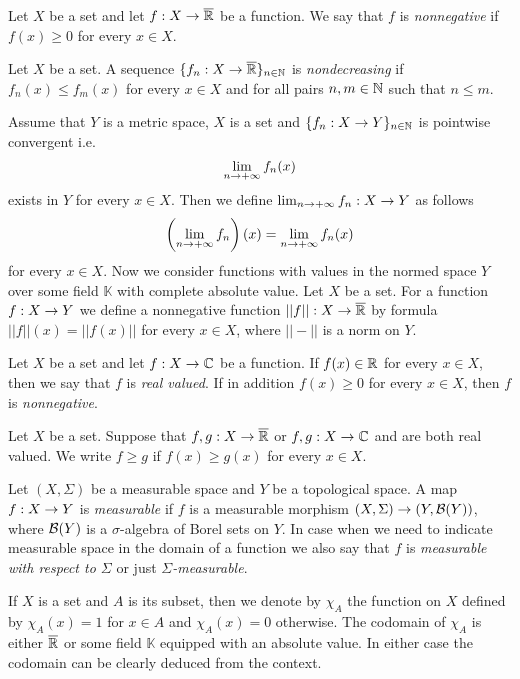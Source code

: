 \begin{definition}
Let $X$ be a set and let $f:X\rightarrow \overline{{\mathbb R}}$ be a function. We say that $f$ is \textit{nonnegative} if $f(x) \geq 0$ for every $x\in X$.
\end{definition}

\begin{definition}
Let $X$ be a set. A sequence $\{f_n:X\rightarrow \overline{{\mathbb R}}\}_{n\in {\mathbb N}}$ is \textit{nondecreasing} if $f_n(x) \leq f_m(x)$ for every $x\in X$ and for all pairs $n, m\in {\mathbb N}$ such that $n\leq m$.
\end{definition}
\noindent
Assume that $Y$ is a metric space, $X$ is a set and $\{f_n:X\rightarrow Y\}_{n\in {\mathbb N}}$ is pointwise convergent i.e.
$$\lim_{n\rightarrow +\infty}f_n(x)$$
exists in $Y$ for every $x\in X$. Then we define $\lim_{n\rightarrow +\infty}f_n:X\rightarrow Y$ as follows
$$\left(\lim_{n\rightarrow +\infty}f_n\right)(x) = \lim_{n\rightarrow +\infty}f_n(x)$$
for every $x\in X$. Now we consider functions with values in the normed space $Y$ over some field $\mathbb{K}$ with complete absolute value. Let $X$ be a set. For a function $f:X\rightarrow Y$ we define a nonnegative function $||f||:X\rightarrow \overline{{\mathbb R}}$ by formula $||f||(x) = ||f(x)||$ for every $x\in X$, where $||-||$ is a norm on $Y$.

\begin{definition}
Let $X$ be a set and let $f:X\rightarrow {\mathbb C}$ be a function. If $f(x)\in {\mathbb R}$ for every $x\in X$, then we say that $f$ is \textit{real valued}. If in addition $f(x)\geq 0$ for every $x\in X$, then $f$ is \textit{nonnegative}.
\end{definition}
\noindent
Let $X$ be a set. Suppose that $f,g:X\rightarrow \overline{{\mathbb R}}$ or $f,g:X\rightarrow {\mathbb C}$ and are both real valued. We write $f\geq g$ if $f(x)\geq g(x)$ for every $x\in X$.

\begin{definition}
Let $(X,\Sigma)$ be a measurable space and $Y$ be a topological space. A map $f:X\rightarrow Y$ is \textit{measurable} if $f$ is a measurable morphism $(X,\Sigma)\rightarrow (Y,{\mathcal B}(Y))$, where ${\mathcal B}(Y)$ is a $\sigma$-algebra of Borel sets on $Y$. In case when we need to indicate measurable space in the domain of a function we also say that $f$ is \textit{measurable with respect to $\Sigma$} or just \textit{$\Sigma$-measurable}. 
\end{definition}
\noindent
If $X$ is a set and $A$ is its subset, then we denote by $\chi_A$ the function on $X$ defined by $\chi_A(x)=1$ for $x\in A$ and $\chi_A(x)=0$ otherwise. The codomain of $\chi_A$ is either $\overline{{\mathbb R}}$ or some field $\mathbb{K}$ equipped with an absolute value. In either case the codomain can be clearly deduced from the context.


